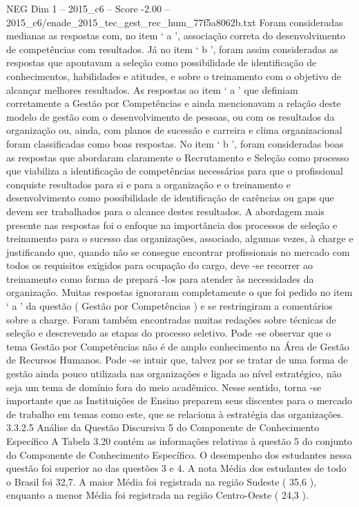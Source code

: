\begin{textsample}{NEG Dim 1 – 2015\_c6 – Score -2.00 – 2015\_c6/enade\_2015\_tec\_gest\_rec\_hum\_77f5a8062b.txt}
Foram consideradas medianas as respostas com, no item ‘ a ’, associação correta do desenvolvimento de competências com resultados.
Já no item ‘ b ’, foram assim consideradas as respostas que apontavam a seleção como possibilidade de identificação de conhecimentos, habilidades e atitudes, e sobre o treinamento com o objetivo de alcançar melhores resultados.
As respostas ao item ‘ a ’ que definiam corretamente a Gestão por Competências e ainda mencionavam a relação deste modelo de gestão com o desenvolvimento de pessoas, ou com os resultados da organização ou, ainda, com planos de sucessão e carreira e clima organizacional foram classificadas como boas respostas.
No item ‘ b ’, foram consideradas boas as respostas que abordaram claramente o Recrutamento e Seleção como processo que viabiliza a identificação de competências necessárias para que o profissional conquiste resultados para si e para a organização e o treinamento e desenvolvimento como possibilidade de identificação de carências ou gaps que devem ser trabalhados para o alcance destes resultados.
A abordagem mais presente nas respostas foi o enfoque na importância dos processos de seleção e treinamento para o sucesso das organizações, associado, algumas vezes, à charge e justificando que, quando não se consegue encontrar profissionais no mercado com todos os requisitos exigidos para ocupação do cargo, deve -se recorrer ao treinamento como forma de prepará -los para atender às necessidades da organização.
Muitas respostas ignoraram completamente o que foi pedido no item ‘ a ’ da questão ( Gestão por Competências ) e se restringiram a comentários sobre a charge.
Foram também encontradas muitas redações sobre técnicas de seleção e descrevendo as etapas do processo seletivo.
Pode -se observar que o tema Gestão por Competências não é de amplo conhecimento na Área de Gestão de Recursos Humanos.
Pode -se intuir que, talvez por se tratar de uma forma de gestão ainda pouco utilizada nas organizações e ligada ao nível estratégico, não seja um tema de domínio fora do meio acadêmico.
Nesse sentido, torna -se importante que as Instituições de Ensino preparem seus discentes para o mercado de trabalho em temas como este, que se relaciona à estratégia das organizações. 3.3.2.5 Análise da Questão Discursiva 5 do Componente de Conhecimento Específico A Tabela 3.20 contém as informações relativas à questão 5 do conjunto do Componente de Conhecimento Específico.
O desempenho dos estudantes nessa questão foi superior ao das questões 3 e 4.
A nota Média dos estudantes de todo o Brasil foi 32,7.
A maior Média foi registrada na região Sudeste ( 35,6 ), enquanto a menor Média foi registrada na região Centro-Oeste ( 24,3 ).

\end{textsample}
